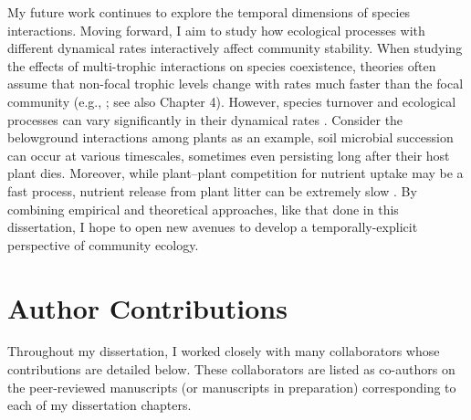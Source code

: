 My future work continues to explore the temporal dimensions of species interactions. Moving forward, I aim to study how ecological processes with different dynamical rates interactively affect community stability. When studying the effects of multi-trophic interactions on species coexistence, theories often assume that non-focal trophic levels change with rates much faster than the focal community (e.g., \citealp{Chesson2008}; see also Chapter 4). However, species turnover and ecological processes can vary significantly in their dynamical rates \citep{Rinaldi2000, Menge2012, LiChesson2016}. Consider the belowground interactions among plants as an example, soil microbial succession can occur at various timescales, sometimes even persisting long after their host plant dies. Moreover, while plant--plant competition for nutrient uptake may be a fast process, nutrient release from plant litter can be extremely slow \citep{Menge2008}. By combining empirical and theoretical approaches, like that done in this dissertation, I hope to open new avenues to develop a temporally-explicit perspective of community ecology.
\par



\section{Author Contributions}
Throughout my dissertation, I worked closely with many collaborators whose contributions are detailed below. These collaborators are listed as co-authors on the peer-reviewed manuscripts (or manuscripts in preparation) corresponding to each of my dissertation chapters.
\par


